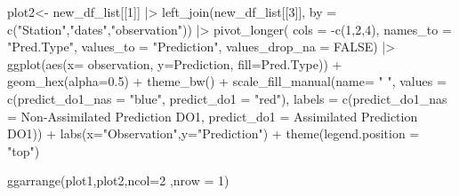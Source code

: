 \documentclass[
  letterpaper,
  DIV=11,
  numbers=noendperiod,
  abstract]{scrartcl}
\newenvironment{Shaded}{\begin{snugshade}}{\end{snugshade}}
\newcommand{\AttributeTok}[1]{\textcolor[rgb]{0.40,0.45,0.13}{#1}}
\newcommand{\ConstantTok}[1]{\textcolor[rgb]{0.56,0.35,0.01}{#1}}
\newcommand{\DecValTok}[1]{\textcolor[rgb]{0.68,0.00,0.00}{#1}}
\newcommand{\FloatTok}[1]{\textcolor[rgb]{0.68,0.00,0.00}{#1}}
\newcommand{\FunctionTok}[1]{\textcolor[rgb]{0.28,0.35,0.67}{#1}}
\newcommand{\NormalTok}[1]{\textcolor[rgb]{0.00,0.23,0.31}{#1}}
\newcommand{\OtherTok}[1]{\textcolor[rgb]{0.00,0.23,0.31}{#1}}
\newcommand{\SpecialCharTok}[1]{\textcolor[rgb]{0.37,0.37,0.37}{#1}}
\newcommand{\StringTok}[1]{\textcolor[rgb]{0.13,0.47,0.30}{#1}}
\begin{document}
\begin{Shaded}
\begin{Highlighting}[]
\NormalTok{plot2}\OtherTok{\textless{}{-}} 
\NormalTok{  new\_df\_list[[}\DecValTok{1}\NormalTok{]] }\SpecialCharTok{|\textgreater{}}
    \FunctionTok{left\_join}\NormalTok{(new\_df\_list[[}\DecValTok{3}\NormalTok{]], }\AttributeTok{by =} \FunctionTok{c}\NormalTok{(}\StringTok{"Station"}\NormalTok{,}\StringTok{"dates"}\NormalTok{,}\StringTok{"observation"}\NormalTok{)) }\SpecialCharTok{|\textgreater{}}
      \FunctionTok{pivot\_longer}\NormalTok{(}
        \AttributeTok{cols =} \SpecialCharTok{{-}}\FunctionTok{c}\NormalTok{(}\DecValTok{1}\NormalTok{,}\DecValTok{2}\NormalTok{,}\DecValTok{4}\NormalTok{),}
        \AttributeTok{names\_to =} \StringTok{"Pred.Type"}\NormalTok{,}
        \AttributeTok{values\_to =} \StringTok{"Prediction"}\NormalTok{,}
        \AttributeTok{values\_drop\_na =} \ConstantTok{FALSE}\NormalTok{) }\SpecialCharTok{|\textgreater{}}
\FunctionTok{ggplot}\NormalTok{(}\FunctionTok{aes}\NormalTok{(}\AttributeTok{x=}\NormalTok{ observation, }\AttributeTok{y=}\NormalTok{Prediction, }\AttributeTok{fill=}\NormalTok{Pred.Type)) }\SpecialCharTok{+} 
  \FunctionTok{geom\_hex}\NormalTok{(}\AttributeTok{alpha=}\FloatTok{0.5}\NormalTok{) }\SpecialCharTok{+} \FunctionTok{theme\_bw}\NormalTok{() }\SpecialCharTok{+}
  \FunctionTok{scale\_fill\_manual}\NormalTok{(}\AttributeTok{name=} \StringTok{" "}\NormalTok{,}
      \AttributeTok{values =} \FunctionTok{c}\NormalTok{(}\StringTok{\textquotesingle{}predict\_do1\_nas\textquotesingle{}} \OtherTok{=} \StringTok{"blue"}\NormalTok{,}
                  \StringTok{\textquotesingle{}predict\_do1\textquotesingle{}} \OtherTok{=} \StringTok{"red"}\NormalTok{),}
      \AttributeTok{labels =} \FunctionTok{c}\NormalTok{(}\StringTok{\textquotesingle{}predict\_do1\_nas\textquotesingle{}} \OtherTok{=} \StringTok{\textquotesingle{}Non{-}Assimilated Prediction DO1\textquotesingle{}}\NormalTok{,}
                  \StringTok{\textquotesingle{}predict\_do1\textquotesingle{}} \OtherTok{=} \StringTok{\textquotesingle{}Assimilated Prediction DO1\textquotesingle{}}\NormalTok{)) }\SpecialCharTok{+}
  \FunctionTok{labs}\NormalTok{(}\AttributeTok{x=}\StringTok{"Observation"}\NormalTok{,}\AttributeTok{y=}\StringTok{"Prediction"}\NormalTok{) }\SpecialCharTok{+} \FunctionTok{theme}\NormalTok{(}\AttributeTok{legend.position =} \StringTok{"top"}\NormalTok{)}

\FunctionTok{ggarrange}\NormalTok{(plot1,plot2,}\AttributeTok{ncol=}\DecValTok{2}\NormalTok{ ,}\AttributeTok{nrow =} \DecValTok{1}\NormalTok{)}
\end{Highlighting}
\end{Shaded}
\end{document}
